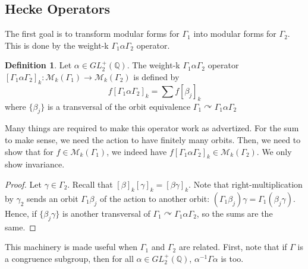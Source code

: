 \documentclass[11pt]{article}
\theoremstyle{plain}
\theoremstyle{definition}
\newtheorem{definition}{Definition}[section]
\theoremstyle{example}
\theoremstyle{remark}
\theoremstyle{lemma}
\theoremstyle{proposition}
\theoremstyle{Problem}
\theoremstyle{Solution}
\theoremstyle{theorem}
\theoremstyle{corollary}
\begin{document}
\subsection{Hecke Operators}
The first goal is to transform modular forms for $\Gamma_1$ into modular forms for $\Gamma_2$. This is done by the weight-k $\Gamma_1\alpha\Gamma_2$ operator. 
\begin{definition}
Let $\alpha\in GL_2^+(\mathbb{Q})$. The weight-k $\Gamma_1\alpha\Gamma_2$ operator $[\Gamma_1\alpha\Gamma_2]_k : \mathcal{M}_k(\Gamma_1) \to \mathcal{M}_k(\Gamma_2)$ is defined by
$$ f[\Gamma_1\alpha\Gamma_2]_k = \sum f[\beta_j]_k$$
where $\{\beta_j\}$ is a transversal of the orbit equivalence $\Gamma_1\curvearrowright\Gamma_1\alpha\Gamma_2$
\end{definition}

Many things are required to make this operator work as advertized. For the sum to make sense, we need the action to have finitely many orbits. Then, we need to show that for $f\in\mathcal{M}_k(\Gamma_1)$, we indeed have $ f[\Gamma_1\alpha\Gamma_2]_k\in \mathcal{M}_k(\Gamma_2)$. We only show invariance.\\
\begin{proof}
Let $\gamma\in \Gamma_2$. Recall that $[\beta]_k[\gamma]_k = [\beta\gamma]_k$. 
Note that right-multiplication by $\gamma_2$ sends an orbit $\Gamma_1\beta_j$ of the action to another orbit: $(\Gamma_1\beta_j)\gamma= \Gamma_1(\beta_j\gamma)$. Hence, if $\{\beta_j \gamma\}$ is another transversal of $\Gamma_1\curvearrowright\Gamma_1\alpha\Gamma_2$, so the sums are the same.
\end{proof}

This machinery is made useful when $\Gamma_1$ and $\Gamma_2$ are related. First, note that if $\Gamma$ is a congruence subgroup, then for all $\alpha\in GL_2^+(\mathbb{Q})$,  $\alpha^{-1}\Gamma\alpha$ is too.
\end{document}
